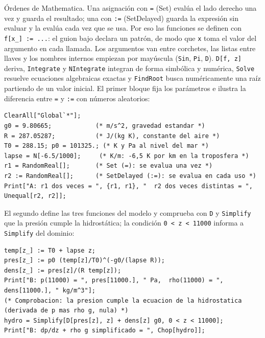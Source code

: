 \documentclass[10pt,openany]{book}
\begin{document}
Órdenes de Mathematica. Una asignación con \texttt{=} (Set) evalúa el lado derecho una vez y guarda el resultado; una con \texttt{:=} (SetDelayed) guarda la expresión sin evaluar y la evalúa cada vez que se usa. Por eso las funciones se definen con \texttt{f[x\_] := ...}: el guion bajo declara un patrón, de modo que \texttt{x} toma el valor del argumento en cada llamada. Los argumentos van entre corchetes, las listas entre llaves y los nombres internos empiezan por mayúscula (\texttt{Sin}, \texttt{Pi}, \texttt{D}). \texttt{D[f, z]} deriva, \texttt{Integrate} y \texttt{NIntegrate} integran de forma simbólica y numérica, \texttt{Solve} resuelve ecuaciones algebraicas exactas y \texttt{FindRoot} busca numéricamente una raíz partiendo de un valor inicial. El primer bloque fija los parámetros e ilustra la diferencia entre \texttt{=} y \texttt{:=} con números aleatorios:
\begin{lstlisting}[style=studium]
ClearAll["Global`*"];
g0 = 9.80665;            (* m/s^2, gravedad estandar *)
R = 287.05287;           (* J/(kg K), constante del aire *)
T0 = 288.15; p0 = 101325.; (* K y Pa al nivel del mar *)
lapse = N[-6.5/1000];     (* K/m: -6,5 K por km en la troposfera *)
r1 = RandomReal[];       (* Set (=): se evalua una vez *)
r2 := RandomReal[];      (* SetDelayed (:=): se evalua en cada uso *)
Print["A: r1 dos veces = ", {r1, r1}, "  r2 dos veces distintas = ", Unequal[r2, r2]];
\end{lstlisting}
El segundo define las tres funciones del modelo y comprueba con \texttt{D} y \texttt{Simplify} que la presión cumple la hidrostática; la condición \texttt{0 < z < 11000} informa a \texttt{Simplify} del dominio:
\begin{lstlisting}[style=studium]
temp[z_] := T0 + lapse z;
pres[z_] := p0 (temp[z]/T0)^(-g0/(lapse R));
dens[z_] := pres[z]/(R temp[z]);
Print["B: p(11000) = ", pres[11000.], " Pa,  rho(11000) = ", dens[11000.], " kg/m^3"];
(* Comprobacion: la presion cumple la ecuacion de la hidrostatica (derivada de p mas rho g, nula) *)
hydro = Simplify[D[pres[z], z] + dens[z] g0, 0 < z < 11000];
Print["B: dp/dz + rho g simplificado = ", Chop[hydro]];
\end{lstlisting}
\end{document}
